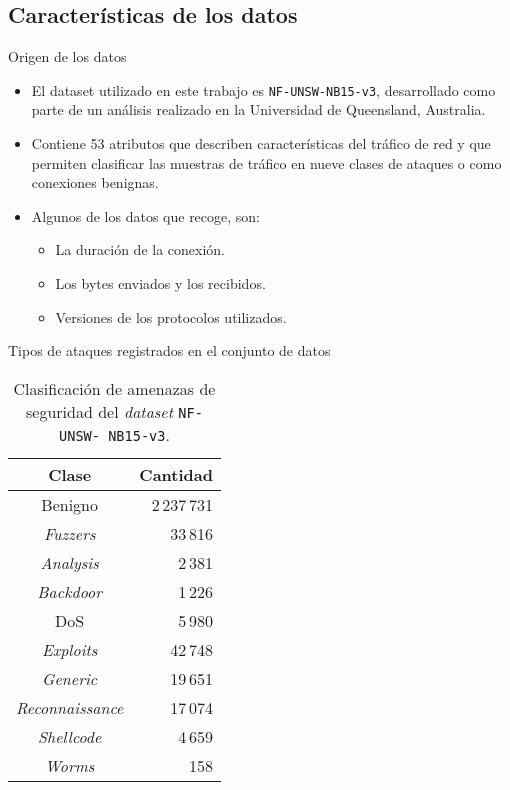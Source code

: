 \subsection{Características de los datos}
\begin{frame}{Origen de los datos}

\begin{itemize}
	\item El dataset utilizado en este trabajo es \texttt{NF-UNSW-NB15-v3}, desarrollado como parte de un análisis realizado en la Universidad de Queensland, Australia.
	 \vspace{10mm}
	\item Contiene 53 atributos que describen características del tráfico de red y que permiten clasificar las muestras de tráfico en nueve clases de ataques o como conexiones benignas. 
	 \vspace{10mm}
	\item Algunos de los datos que recoge, son:
\begin{itemize}
	\item La duración de la conexión.
	\item Los bytes enviados y los recibidos.
	\item Versiones de los protocolos utilizados.
\end{itemize}

\end{itemize}
\end{frame}

\begin{frame}{Tipos de ataques registrados en el conjunto de datos}

\begin{table}[H]
\centering
\begin{tabular}{|c|r|} 
\hline
\rowcolor[HTML]{f0f7ff}  
\textbf{Clase} & \textbf{Cantidad} \\ \hline
Benigno & 2\,237\,731 \\ \hline
\textit{Fuzzers} & 33\,816 \\ \hline
\textit{Analysis} & 2\,381 \\ \hline
\textit{Backdoor} & 1\,226 \\ \hline
DoS & 5\,980 \\ \hline
\textit{Exploits} & 42\,748 \\ \hline
\textit{Generic} & 19\,651 \\ \hline
\textit{Reconnaissance} & 17\,074 \\ \hline
\textit{Shellcode} & 4\,659 \\ \hline
\textit{Worms} & 158 \\ \hline
\end{tabular}
\caption{Clasificación de amenazas de seguridad del \textit{dataset} \texttt{NF-UNSW- NB15-v3}.}
\label{tab:attacks-tab}
\end{table}

\end{frame}

